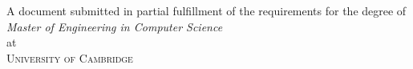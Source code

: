 \begin{titlepage}
  \vspace*{5cm}
  \makeatletter
  \begin{center}
    \begin{Huge}
      \@title
    \end{Huge}\\[0.1cm]
    \begin{Large}
      \@subtitle
    \end{Large}\\[1cm]
    \@author
    \vfill
    A document submitted in partial fulfillment
    of the requirements for the degree of\\
    \emph{Master of Engineering in Computer Science}\\
    at\\
    \textsc{University of Cambridge}
  \end{center}
  \makeatother
\end{titlepage}

\newpage
\null
\thispagestyle{empty}
\newpage